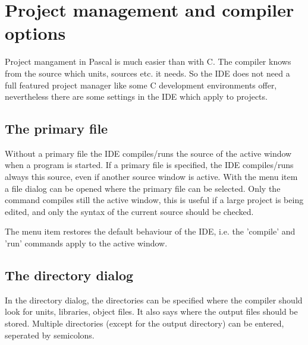 \section{Project management and compiler options}
\label{se:projectmanagement}
Project mangament in Pascal is much easier than with C. The
compiler knows from the source which units, sources etc. it needs.
So the \fpc IDE does not need a full featured project manager like
some C development environments offer, nevertheless there are some
settings in the IDE which apply to projects.
%
%
\subsection{The primary file}
\label{se:primaryfile}
Without a primary file the IDE compiles/runs the source of the active
window when a program is started. If a primary file is specified, 
the IDE compiles/runs always this source, even if another
source window is active. With the menu item 
a file dialog can be opened where the primary file can be selected. 
Only the command  compiles still the active window, 
this is useful if a large project is being edited, and only the syntax of 
the current source should be checked. 

The menu item  restores the default
behaviour of the IDE, i.e. the 'compile' and 'run' commands apply to the 
active window.
%
%
\subsection{The directory dialog}
In the directory dialog, the directories can be specified where the 
compiler should look for units, libraries, object files. It also says
where the output files should be stored. Multiple directories (except 
for the output directory) can be entered, seperated by semicolons.

